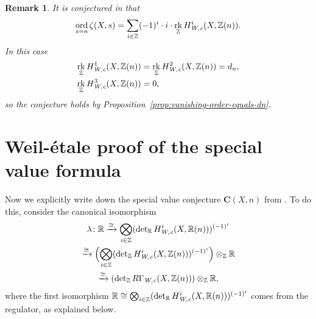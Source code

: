 \documentclass[draft]{article}
\DeclareMathOperator{\ord}{ord}
\DeclareMathOperator{\rk}{rk}
\newcommand{\RR}{\mathbb{R}}
\newcommand{\ZZ}{\mathbb{Z}}
\renewcommand{\det}{\operatorname{det}}
\newcommand{\Wc}{\text{\it W,c}}
\theoremstyle{myplain}
\theoremstyle{mydefinition}
\newtheorem{remark}[theorem]{Remark}
\begin{document}
\begin{remark}
  It is conjectured in \cite[\S 3]{Beshenov-Weil-etale-2} that
  \[ \ord_{s = n} \zeta (X,s) =
    \sum_{i\in \ZZ} (-1)^i\cdot i\cdot\rk_\ZZ H^i_\Wc (X,\ZZ(n)). \]
  In this case
  \begin{align*}
    \rk_\ZZ H^1_\Wc (X,\ZZ(n)) & = \rk_\ZZ H^2_\Wc (X,\ZZ(n)) = d_n, \\
    \rk_\ZZ H^3_\Wc (X,\ZZ(n)) & = 0,
  \end{align*}
  so the conjecture holds by Proposition~\ref{prop:vanishing-order-equals-dn}.
\end{remark}


\section{Weil-\'{e}tale proof of the special value formula}
\label{sec:Weil-etale-proof}

Now we explicitly write down the special value conjecture $\mathbf{C} (X,n)$
from \cite[\S 4]{Beshenov-Weil-etale-2}. To do this, consider the canonical
isomorphism
\begin{multline*}
  \lambda\colon \RR \xrightarrow{\cong}
  \bigotimes_{i\in \ZZ} (\det_\RR H^i_\Wc (X, \RR (n)))^{(-1)^i} \\
  \xrightarrow{\cong} \Bigl(\bigotimes_{i\in \ZZ} (\det_\ZZ H^i_\Wc (X, \ZZ (n)))^{(-1)^i}\Bigr) \otimes_\ZZ \RR \\
  \xrightarrow{\cong} (\det_\ZZ R\Gamma_\Wc (X, \ZZ (n))) \otimes_\ZZ \RR,
\end{multline*}
where the first isomorphism
$\RR \cong \bigotimes_{i\in \ZZ} (\det_\RR H^i_\Wc (X, \RR (n)))^{(-1)^i}$
comes from the regulator, as explained below.

\vspace{1em}
\end{document}
